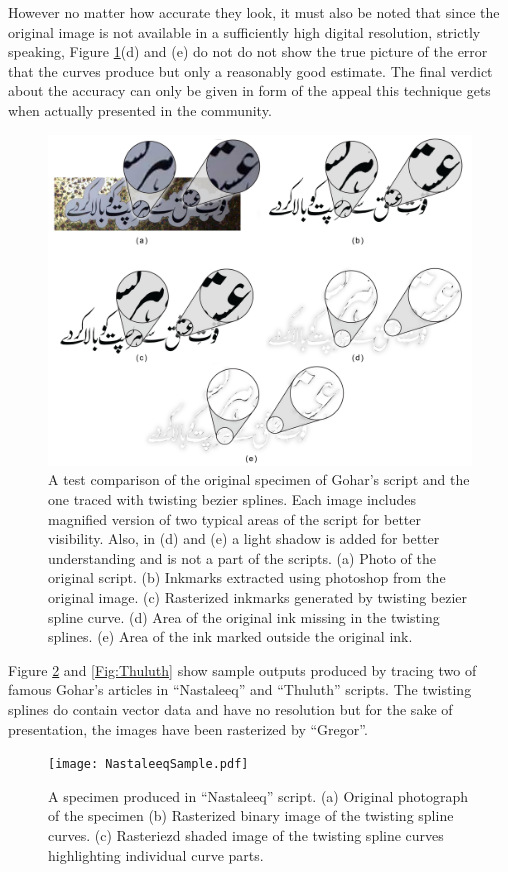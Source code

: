 However no matter how accurate they look, it must also be noted that since the original image is not available in a sufficiently high digital resolution, strictly speaking, Figure \ref{Fig:InkComparison}(d) and (e) do not do not show the true picture of the error that the curves produce but only a reasonably good estimate. The final verdict about the accuracy can only be given in form of the appeal this technique gets when actually presented in the community.

\begin{figure}
  \centering
  \includegraphics[width=1\textwidth]{InkComparison.jpg}
  \caption{A test comparison of the original specimen of Gohar's script and the one traced with twisting bezier splines. Each image includes magnified version of two typical areas of the script for better visibility. Also, in (d) and (e) a light shadow is added for better understanding and is not a part of the scripts. (a) Photo of the original script. (b) Inkmarks extracted using photoshop from the original image. (c) Rasterized inkmarks generated by twisting bezier spline curve. (d) Area of the original ink missing in the twisting splines. (e) Area of the ink marked outside the original ink.
  }
\label{Fig:InkComparison}
\end{figure}

Figure \ref{Fig:Nastaleeq} and \ref{Fig:Thuluth} show sample outputs produced by tracing two of famous Gohar's articles in ``Nastaleeq'' and ``Thuluth'' scripts. The twisting splines do contain vector data and have no resolution but for the sake of presentation, the images have been rasterized by ``Gregor''.
\begin{figure}
  \centering
  \texttt{[image: NastaleeqSample.pdf]}
  \caption{A specimen produced in ``Nastaleeq'' script. (a) Original photograph of the specimen (b) Rasterized binary image of the twisting spline curves. (c) Rasteriezd shaded image of the twisting spline curves highlighting individual curve parts.}
  \label{Fig:Nastaleeq}
\end{figure}

